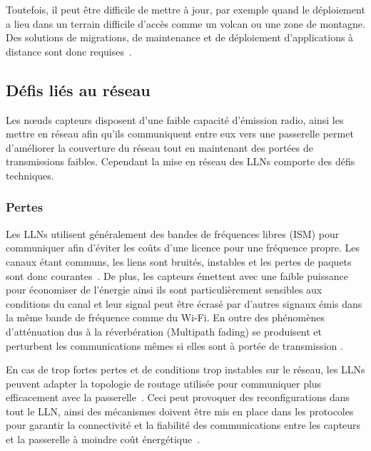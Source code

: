 Toutefois, il peut être difficile de mettre à jour, par exemple quand le déploiement a lieu dans un terrain difficile d'accès comme un volcan ou une zone de montagne.
Des solutions de migrations, de maintenance et de déploiement d'applications à distance sont donc requises~\cite{brown2006updating, stathopoulos2003remote}.

\subsection{Défis liés au réseau}

Les nœuds capteurs disposent d'une faible capacité d'émission radio, ainsi les mettre en réseau afin qu'ils communiquent entre eux vers une passerelle permet d'améliorer la couverture du réseau tout en maintenant des portées de transmissions faibles.
Cependant la mise en réseau des \ac{LLN}s comporte des défis techniques.

\subsubsection{Pertes}

Les \ac{LLN}s utilisent généralement des bandes de fréquences libres (\ac{ISM}) pour communiquer afin d'éviter les coûts d'une licence pour une fréquence propre.
Les canaux étant communs, les liens sont bruités, instables et les pertes de paquets sont donc courantes~\cite{baccour2012radio}.
De plus, les capteurs émettent avec une faible puissance pour économiser de l'énergie ainsi ils sont particulièrement sensibles aux conditions du canal et leur signal peut être écrasé par d'autres signaux émis dans la même bande de fréquence comme du Wi-Fi.
En outre des phénomènes d’atténuation dus à la réverbération (Multipath fading) se produisent et perturbent les communications mêmes si elles sont à portée de transmission \cite{puccinelli2006multipath}.


En cas de trop fortes pertes et de conditions trop instables sur le réseau, les \ac{LLN}s peuvent adapter la topologie de routage utilisée pour communiquer plus efficacement avec la passerelle~\cite{clausen2011critical}.
Ceci peut provoquer des reconfigurations dans tout le \ac{LLN}, ainsi des mécanismes doivent être mis en place dans les protocoles pour garantir la connectivité et la fiabilité des communications entre les capteurs et la passerelle à moindre coût énergétique~\cite{6tisch}.

